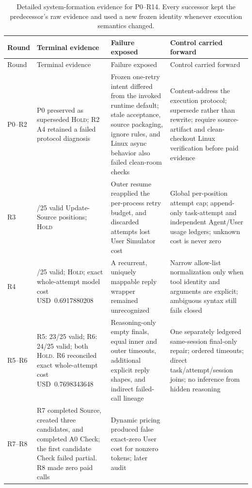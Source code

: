 \documentclass[10pt,twocolumn]{article}
\newcommand{\hold}{\textsc{Hold}\xspace}
\begin{document}
\begingroup
\footnotesize
\setlength{\tabcolsep}{3.5pt}
\renewcommand{\arraystretch}{1.17}
\begin{longtable}{
  >{\raggedright\arraybackslash}p{}
  >{\raggedright\arraybackslash}p{}
  >{\raggedright\arraybackslash}p{}
  >{\raggedright\arraybackslash}p{}
}
\caption{Detailed system-formation evidence for P0--R14. Every successor kept
the predecessor's raw evidence and used a new frozen identity whenever
execution semantics changed.}
\label{tab:formation-history}\\
\toprule
Round & Terminal evidence & Failure exposed & Control carried forward \\
\midrule
\endfirsthead
\toprule
Round & Terminal evidence & Failure exposed & Control carried forward \\
\midrule
\endhead
P0--R2 & P0 preserved as superseded \hold; R2 A4 retained a failed protocol
diagnosis & Frozen one-retry intent differed from the invoked runtime default;
stale acceptance, source packaging, ignore rules, and Linux async behavior also
failed clean-room checks & Content-address the execution protocol; supersede
rather than rewrite; require source-artifact and clean-checkout Linux
verification before paid evidence \\
R3 & 22/25 valid Update-Source positions; \hold & Outer resume reapplied the
per-process retry budget, and discarded attempts lost User Simulator cost &
Global per-position attempt cap; append-only task-attempt and independent
Agent/User usage ledgers; unknown cost is never zero \\
R4 & 24/25 valid; \hold; exact whole-attempt model cost USD~0.6917880208 & A
recurrent, uniquely mappable reply wrapper remained unrecognized & Narrow
allow-list normalization only when tool identity and arguments are explicit;
ambiguous syntax still fails closed \\
R5--R6 & R5: 23/25 valid; R6: 24/25 valid; both \hold. R6 reconciled exact
whole-attempt cost USD~0.7698343648 & Reasoning-only empty finals, equal inner
and outer timeouts, additional explicit reply shapes, and indirect failed-call
lineage & One separately ledgered same-session final-only repair; ordered
timeouts; direct task/attempt/session joins; no inference from hidden reasoning \\
R7--R8 & R7 completed Source, created three candidates, and completed A0 Check;
the first candidate Check failed partial. R8 made zero paid calls & Dynamic
pricing produced false exact-zero User cost for nonzero tokens; later audit

\end{longtable}
\end{document}

